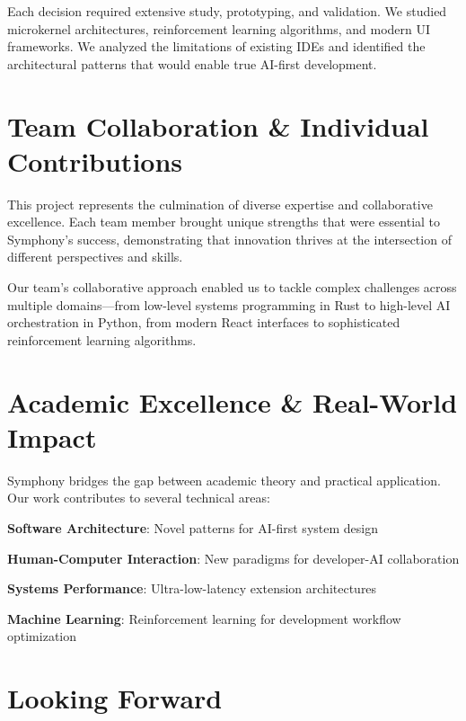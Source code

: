 Each decision required extensive study, prototyping, and validation. We studied microkernel architectures, reinforcement learning algorithms, and modern UI frameworks. We analyzed the limitations of existing IDEs and identified the architectural patterns that would enable true AI-first development.

\section*{Team Collaboration \& Individual Contributions}

\begin{successbox}
This project represents the culmination of diverse expertise and collaborative excellence. Each team member brought unique strengths that were essential to Symphony's success, demonstrating that innovation thrives at the intersection of different perspectives and skills.
\end{successbox}

Our team's collaborative approach enabled us to tackle complex challenges across multiple domains—from low-level systems programming in Rust to high-level AI orchestration in Python, from modern React interfaces to sophisticated reinforcement learning algorithms.

\section*{Academic Excellence \& Real-World Impact}

Symphony bridges the gap between academic theory and practical application. Our work contributes to several technical areas:

\begin{compactlist}
    \item \textbf{Software Architecture}: Novel patterns for AI-first system design
    \item \textbf{Human-Computer Interaction}: New paradigms for developer-AI collaboration
    \item \textbf{Systems Performance}: Ultra-low-latency extension architectures
    \item \textbf{Machine Learning}: Reinforcement learning for development workflow optimization
\end{compactlist}

\section*{Looking Forward}


